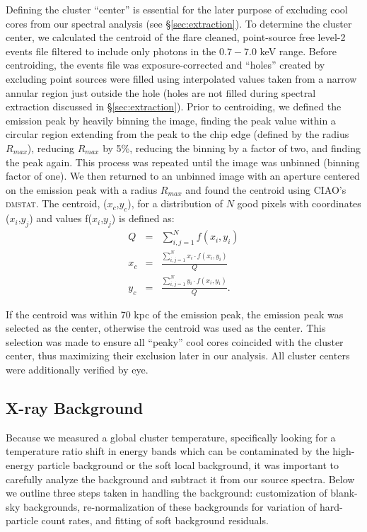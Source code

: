 \documentclass[apj]{emulateapj}
\begin{document}
Defining the cluster ``center'' is essential for the later purpose of
excluding cool cores from our spectral analysis (see
\S\ref{sec:extraction}). To determine the cluster center, we
calculated the centroid of the flare cleaned, point-source
free level-2 events file filtered to include only photons in the
$0.7-7.0$ keV range. Before centroiding, the events file was
exposure-corrected and ``holes'' created by excluding point sources
were filled using interpolated values taken from a narrow annular region just
outside the hole (holes are not filled during spectral extraction
discussed in \S\ref{sec:extraction}). Prior to centroiding, we defined
the emission peak by heavily binning the image, finding the peak value
within a circular region extending from the peak to the chip edge
(defined by the radius $R_{max}$), reducing $R_{max}$ by 5\%,
reducing the binning by a factor of two, and finding the peak
again. This process was repeated until the image was unbinned (binning
factor of one). We then returned to an unbinned image with an aperture
centered on the emission peak with a radius $R_{max}$ and found the
centroid using {\textsc{CIAO}}'s {\textsc{dmstat}}. The centroid, ($x_c$,$y_c$),
for a distribution of $N$ good pixels with coordinates ($x_i$,$y_j$)
and values f($x_i$,$y_j$) is defined as:
\begin{eqnarray}
Q &=& \sum_{i,j=1}^N f(x_i,y_i) \\
x_c &=& \frac{\sum_{i,j=1}^N x_i \cdot f(x_i,y_i)}{Q} \nonumber \\
y_c &=& \frac{\sum_{i,j=1}^N y_i \cdot f(x_i,y_i)}{Q}. \nonumber
\end{eqnarray}

If the centroid was within 70 kpc of the emission peak, the emission
peak was selected as the center, otherwise the centroid was used
as the center. This selection was made to ensure all ``peaky'' cool
cores coincided with the cluster center, thus maximizing their
exclusion later in our analysis. All cluster centers were additionally
verified by eye.

\subsection{X-ray Background} \label{sec:background}

Because we measured a global cluster temperature, specifically looking
for a temperature ratio shift in energy bands which can be
contaminated by the high-energy particle background or the soft local
background, it was important to carefully analyze the background and
subtract it from our source spectra. Below we outline three steps
taken in handling the background: customization of blank-sky backgrounds,
re-normalization of these backgrounds for variation of hard-particle
count rates, and fitting of soft background residuals.
\end{document}
